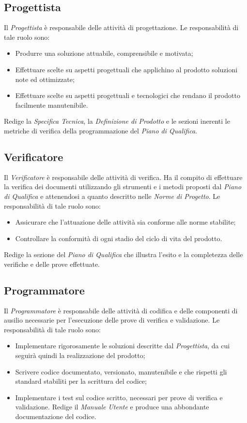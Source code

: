 \subsection{Progettista}
Il \textit{Progettista} è responsabile delle attività di progettazione. Le responsabilità di tale ruolo sono:
\begin{itemize}
\item Produrre una soluzione attuabile, comprensibile e motivata;
\item Effettuare scelte su aspetti progettuali che applichino al prodotto soluzioni note
ed ottimizzate;
\item Effettuare scelte su aspetti progettuali e tecnologici che rendano il prodotto facilmente manutenibile.
\end{itemize}
Redige la \textit{Specifica Tecnica}, la \textit{Definizione di Prodotto} e le sezioni inerenti le metriche di verifica della programmazione del \textit{Piano di Qualifica}.

\subsection{Verificatore}
Il \textit{Verificatore} è responsabile delle attività di verifica. Ha il compito di effettuare la verifica dei documenti utilizzando gli strumenti e i metodi proposti dal \textit{Piano di Qualifica}
e attenendosi a quanto descritto nelle \textit{Norme di Progetto}. Le responsabilità di tale ruolo sono:
\begin{itemize}

\item Assicurare che l'attuazione delle attività sia conforme alle norme stabilite;
\item Controllare la conformità di ogni stadio del ciclo di vita del prodotto.
\end{itemize}
Redige la sezione del \textit{Piano di Qualifica} che illustra l'esito e la completezza delle verifiche e delle prove effettuate.

\subsection{Programmatore}
Il \textit{Programmatore} è responsabile delle attività di codifica e delle componenti di ausilio necessarie per l'esecuzione delle prove di verifica e validazione. Le responsabilità di tale
ruolo sono:
\begin{itemize}
\item Implementare rigorosamente le soluzioni descritte dal \textit{Progettista}, da cui seguirà quindi la realizzazione del prodotto;
\item Scrivere codice documentato, versionato, manutenibile e che rispetti gli standard stabiliti per la scrittura del codice;
\item Implementare i test sul codice scritto, necessari per prove di verifica e validazione.
Redige il \textit{Manuale Utente} e produce una abbondante documentazione del codice.
\end{itemize}